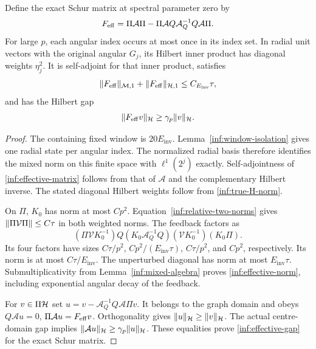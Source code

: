 \begin{proposition}
\label{inf:inverse-Schur}
Define the exact Schur matrix at spectral parameter zero by
\begin{equation}\label{inf:effective-matrix}
 F_{\mathrm{eff}}=\Pi\mathcal A\Pi-
               \Pi\mathcal AQ\mathcal A_Q^{-1}Q\mathcal A\Pi.
\end{equation}
For large $p$, each angular index occurs at most once in its index
set. In radial unit vectors with the original angular $G_j$,
its Hilbert inner product has diagonal weights $\eta_j^2$.
It is self-adjoint for that inner product, satisfies
\begin{equation}\label{inf:effective-norm}
 \lVert F_{\mathrm{eff}}\rVert_{\mathcal M,1}+\lVert F_{\mathrm{eff}}\rVert_{\mathcal{H},1}
                                  \le C_{E_{\mathrm{inv}}}\tau,
\end{equation}
and has the Hilbert gap
\begin{equation}\label{inf:effective-gap}
 \lVert F_{\mathrm{eff}} v\rVert_{\mathcal{H}}\ge\gamma_p\lVert v\rVert_{\mathcal{H}}.
\end{equation}
\end{proposition}
\begin{proof}
The containing fixed window is $20E_{\mathrm{inv}}$.
Lemma~\ref{inf:window-isolation} gives one radial state per angular
index. The normalized radial basis therefore identifies the
mixed norm on this finite space with $\ell^1(2^j)$ exactly.
Self-adjointness of \eqref{inf:effective-matrix} follows from
that of $\mathcal A$ and the complementary Hilbert inverse.
The stated diagonal Hilbert weights follow from
\eqref{inf:true-H-norm}.

On $\Pi$, $K_0$ has norm at most $Cp^2$.
Equation~\eqref{inf:relative-two-norms} gives
$\lVert \Pi\mathcal V\Pi\rVert\le C\tau$ in both weighted norms.
The feedback factors as
\[
 (\Pi\mathcal VK_0^{-1})Q(K_0\mathcal A_Q^{-1}Q)
                     (\mathcal VK_0^{-1})(K_0\Pi).
\]
Its four factors have sizes $C\tau/p^2$,
$Cp^2/(E_{\mathrm{inv}}\tau)$, $C\tau/p^2$, and $Cp^2$,
respectively. Its norm is at most $C\tau/E_{\mathrm{inv}}$.
The unperturbed diagonal has norm at most $E_{\mathrm{inv}}\tau$.
Submultiplicativity from Lemma~\ref{inf:mixed-algebra} proves
\eqref{inf:effective-norm}, including
exponential angular decay of the feedback.

For $v\in\Pi\mathcal{H}$ set
$u=v-\mathcal A_Q^{-1}Q\mathcal A\Pi v$.
It belongs to the graph domain and obeys
$Q\mathcal Au=0$, $\Pi\mathcal Au=F_{\mathrm{eff}} v$.
Orthogonality gives $\lVert u\rVert_{\mathcal{H}}\ge\lVert v\rVert_{\mathcal{H}}$.
The actual centre-domain gap implies
$\lVert \mathcal Au\rVert_{\mathcal{H}}\ge\gamma_p\lVert u\rVert_{\mathcal{H}}$.
These equalities prove \eqref{inf:effective-gap} for the exact
Schur matrix.
\end{proof}

